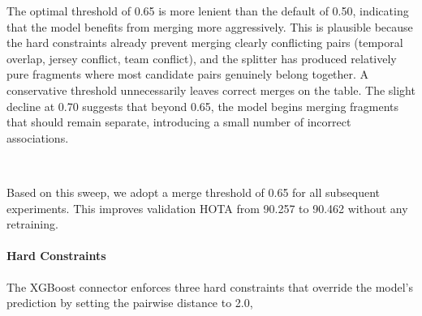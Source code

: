 The optimal threshold of 0.65 is more lenient than the default of 0.50, indicating that the model benefits from merging more aggressively. This is plausible because the hard constraints already prevent merging clearly conflicting pairs (temporal overlap, jersey conflict, team conflict), and the splitter has produced relatively pure fragments where most candidate pairs genuinely belong together. A conservative threshold unnecessarily leaves correct merges on the table. The slight decline at 0.70 suggests that beyond 0.65, the model begins merging fragments that should remain separate, introducing a small number of incorrect associations.

\

Based on this sweep, we adopt a merge threshold of 0.65 for all subsequent experiments. This improves validation HOTA from 90.257 to 90.462 without any retraining.


\paragraph{Hard Constraints}\label{par:hard_constraints}

The XGBoost connector enforces three hard constraints that override the model's prediction by setting the pairwise distance to 2.0,